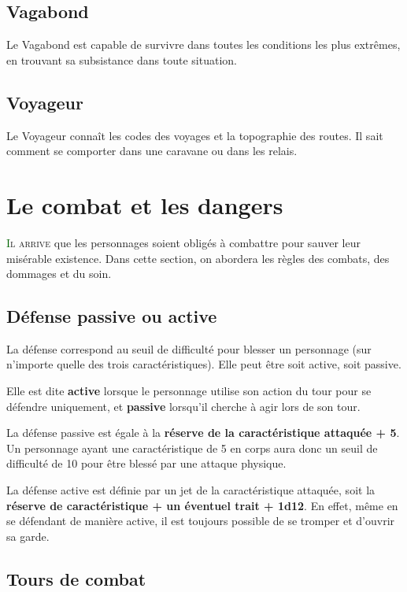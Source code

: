 \documentclass[twoside,12pt,english]{book}
\newcommand*\initfamily{\usefont{U}{Acorn}{xl}{n}}
\begin{document}
\subsection*{Vagabond}

Le Vagabond est capable de survivre dans toutes les conditions les plus extrêmes, en trouvant sa subsistance dans toute situation.

\subsection*{Voyageur}

Le Voyageur connaît les codes des voyages et la topographie des routes. Il sait comment se comporter dans une caravane ou dans les relais.

\newpage

\section{Le combat et les dangers}

\lettrine[lines=3]{\initfamily\textcolor{darkgreen}{I}}{l arrive} que les personnages soient obligés à combattre pour sauver leur misérable existence. Dans cette section, on abordera les règles des combats, des dommages et du soin.

\subsection{Défense passive ou active}

La défense correspond au seuil de difficulté pour blesser un personnage (sur n'importe quelle des trois caractéristiques). Elle peut être soit active, soit passive.

Elle est dite \textbf{active} lorsque le personnage utilise son action du tour pour se défendre uniquement, et \textbf{passive} lorsqu'il cherche à agir lors de son tour.

La défense passive est égale à la \textbf{réserve de la caractéristique attaquée + 5}. Un personnage ayant une caractéristique de 5 en corps aura donc un seuil de difficulté de 10 pour être blessé par une attaque physique.

La défense active est définie par un jet de la caractéristique attaquée, soit la \textbf{réserve de caractéristique + un éventuel trait + 1d12}. En effet, même en se défendant de manière active, il est toujours possible de se tromper et d'ouvrir sa garde.

\subsection{Tours de combat}
\end{document}
